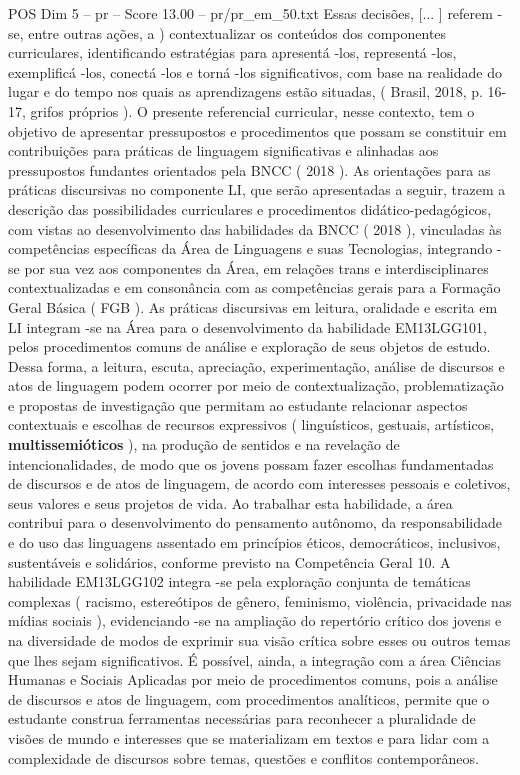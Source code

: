 \begin{textsample}{POS Dim 5 – pr – Score 13.00 – pr/pr\_em\_50.txt}
Essas decisões, [... ] referem -se, entre outras ações, a ) contextualizar os conteúdos dos componentes curriculares, identificando estratégias para apresentá -los, representá -los, exemplificá -los, conectá -los e torná -los significativos, com base na realidade do lugar e do tempo nos quais as aprendizagens estão situadas, ( Brasil, 2018, p. 16-17, grifos próprios ).
O presente referencial curricular, nesse contexto, tem o objetivo de apresentar pressupostos e procedimentos que possam se constituir em contribuições para práticas de linguagem significativas e alinhadas aos pressupostos fundantes orientados pela BNCC ( 2018 ).
As orientações para as práticas discursivas no componente LI, que serão apresentadas a seguir, trazem a descrição das possibilidades curriculares e procedimentos didático-pedagógicos, com vistas ao desenvolvimento das habilidades da BNCC ( 2018 ), vinculadas às competências específicas da Área de Linguagens e suas Tecnologias, integrando -se por sua vez aos componentes da Área, em relações trans e interdisciplinares contextualizadas e em consonância com as competências gerais para a Formação Geral Básica ( FGB ).
As práticas discursivas em leitura, oralidade e escrita em LI integram -se na Área para o desenvolvimento da habilidade EM13LGG101, pelos procedimentos comuns de análise e exploração de seus objetos de estudo.
Dessa forma, a leitura, escuta, apreciação, experimentação, análise de discursos e atos de linguagem podem ocorrer por meio de contextualização, problematização e propostas de investigação que permitam ao estudante relacionar aspectos contextuais e escolhas de recursos expressivos ( linguísticos, gestuais, artísticos, \textbf{multissemióticos} ), na produção de sentidos e na revelação de intencionalidades, de modo que os jovens possam fazer escolhas fundamentadas de discursos e de atos de linguagem, de acordo com interesses pessoais e coletivos, seus valores e seus projetos de vida.
Ao trabalhar esta habilidade, a área contribui para o desenvolvimento do pensamento autônomo, da responsabilidade e do uso das linguagens assentado em princípios éticos, democráticos, inclusivos, sustentáveis e solidários, conforme previsto na Competência Geral 10.
A habilidade EM13LGG102 integra -se pela exploração conjunta de temáticas complexas ( racismo, estereótipos de gênero, feminismo, violência, privacidade nas mídias sociais ), evidenciando -se na ampliação do repertório crítico dos jovens e na diversidade de modos de exprimir sua visão crítica sobre esses ou outros temas que lhes sejam significativos.
É possível, ainda, a integração com a área Ciências Humanas e Sociais Aplicadas por meio de procedimentos comuns, pois a análise de discursos e atos de linguagem, com procedimentos analíticos, permite que o estudante construa ferramentas necessárias para reconhecer a pluralidade de visões de mundo e interesses que se materializam em textos e para lidar com a complexidade de discursos sobre temas, questões e conflitos contemporâneos.

\end{textsample}
